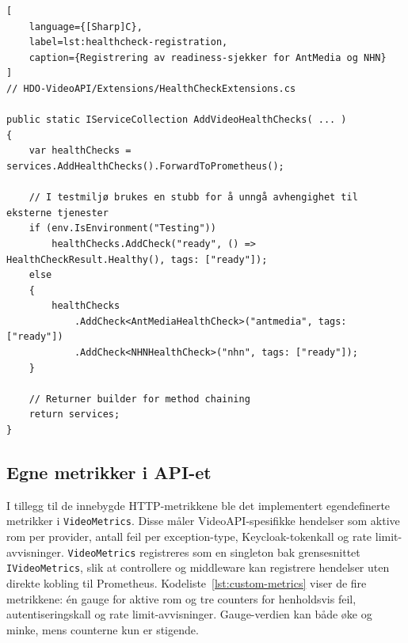 \begin{lstlisting}[
    language={[Sharp]C},
    label=lst:healthcheck-registration,
    caption={Registrering av readiness-sjekker for AntMedia og NHN}
]
// HDO-VideoAPI/Extensions/HealthCheckExtensions.cs

public static IServiceCollection AddVideoHealthChecks( ... )
{
    var healthChecks = services.AddHealthChecks().ForwardToPrometheus();
    
    // I testmiljø brukes en stubb for å unngå avhengighet til eksterne tjenester
    if (env.IsEnvironment("Testing"))
        healthChecks.AddCheck("ready", () => HealthCheckResult.Healthy(), tags: ["ready"]);
    else
    {
        healthChecks
            .AddCheck<AntMediaHealthCheck>("antmedia", tags: ["ready"])
            .AddCheck<NHNHealthCheck>("nhn", tags: ["ready"]);
    }

    // Returner builder for method chaining
    return services;
}
\end{lstlisting}


\subsection{Egne metrikker i API-et}


I tillegg til de innebygde HTTP-metrikkene ble det implementert egendefinerte metrikker i \texttt{VideoMetrics}. Disse måler VideoAPI-spesifikke hendelser som aktive rom per provider, antall feil per exception-type, Keycloak-tokenkall og rate limit-avvisninger. \texttt{VideoMetrics} registreres som en singleton bak grensesnittet \texttt{IVideoMetrics}, slik at controllere og middleware kan registrere hendelser uten direkte kobling til Prometheus. Kodeliste~\ref{lst:custom-metrics} viser de fire metrikkene: én gauge for aktive rom og tre counters for henholdsvis feil, autentiseringskall og rate limit-avvisninger. Gauge-verdien kan både øke og minke, mens counterne kun er stigende.


